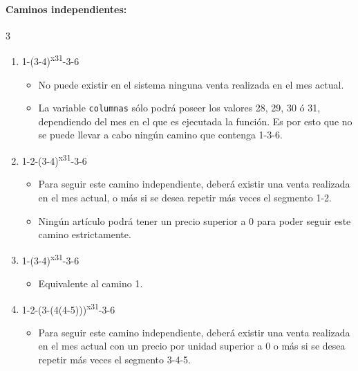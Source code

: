 \paragraph{Caminos independientes:} 3
    \begin{enumerate}
        \item 1-(3-4)\textsuperscript{x31}-3-6
            \begin{itemize}
                \item No puede existir en el sistema ninguna venta realizada en el mes actual.
                \item La variable \texttt{columnas} sólo podrá poseer los valores 28, 29, 30 ó 31, dependiendo del mes en el que es ejecutada la función. Es por esto que no se puede llevar a cabo ningún camino que contenga 1-3-6.
            \end{itemize}
        \item 1-2-(3-4)\textsuperscript{x31}-3-6
            \begin{itemize}
                \item Para seguir este camino independiente, deberá existir  una venta realizada en el mes actual, o más si se desea repetir más veces el segmento 1-2.
                \item Ningún artículo podrá tener un precio superior a 0 para poder seguir este camino estrictamente.
            \end{itemize}
        \item 1-(3-4)\textsuperscript{x31}-3-6
            \begin{itemize}
                \item Equivalente al camino 1.
            \end{itemize}
        \item 1-2-(3-(4\textbar{}\textbar{}(4-5)))\textsuperscript{x31}-3-6
            \begin{itemize}
                \item Para seguir este camino independiente, deberá existir  una venta realizada en el mes actual con un precio por unidad superior a 0 o más si se desea repetir más veces el segmento 3-4-5.
            \end{itemize}
    \end{enumerate}
